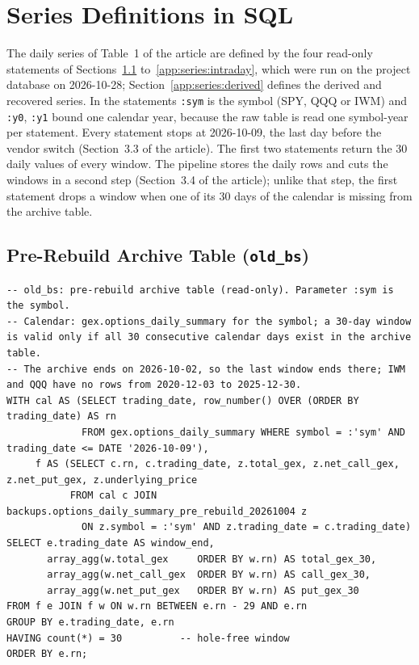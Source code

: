 \section{Series Definitions in SQL}
\label{sup:series}

The daily series of Table~1 of the article are defined by the four read-only statements of Sections~\ref{app:series:old} to~\ref{app:series:intraday}, which were run on the project database on 2026-10-28; Section~\ref{app:series:derived} defines the derived and recovered series. In the statements \texttt{:sym} is the symbol (SPY, QQQ or IWM) and \texttt{:y0}, \texttt{:y1} bound one calendar year, because the raw table is read one symbol-year per statement. Every statement stops at 2026-10-09, the last day before the vendor switch (Section~3.3 of the article). The first two statements return the 30 daily values of every window. The pipeline stores the daily rows and cuts the windows in a second step (Section~3.4 of the article); unlike that step, the first statement drops a window when one of its 30 days of the  calendar is missing from the archive table.

\subsection{Pre-Rebuild Archive Table (\texttt{old\_bs})}
\label{app:series:old}

\begin{lstlisting}[style=appcode]
-- old_bs: pre-rebuild archive table (read-only). Parameter :sym is the symbol.
-- Calendar: gex.options_daily_summary for the symbol; a 30-day window is valid only if all 30 consecutive calendar days exist in the archive table.
-- The archive ends on 2026-10-02, so the last window ends there; IWM and QQQ have no rows from 2020-12-03 to 2025-12-30.
WITH cal AS (SELECT trading_date, row_number() OVER (ORDER BY trading_date) AS rn
             FROM gex.options_daily_summary WHERE symbol = :'sym' AND trading_date <= DATE '2026-10-09'),
     f AS (SELECT c.rn, c.trading_date, z.total_gex, z.net_call_gex, z.net_put_gex, z.underlying_price
           FROM cal c JOIN backups.options_daily_summary_pre_rebuild_20261004 z
             ON z.symbol = :'sym' AND z.trading_date = c.trading_date)
SELECT e.trading_date AS window_end,
       array_agg(w.total_gex     ORDER BY w.rn) AS total_gex_30,
       array_agg(w.net_call_gex  ORDER BY w.rn) AS call_gex_30,
       array_agg(w.net_put_gex   ORDER BY w.rn) AS put_gex_30
FROM f e JOIN f w ON w.rn BETWEEN e.rn - 29 AND e.rn
GROUP BY e.trading_date, e.rn
HAVING count(*) = 30          -- hole-free window
ORDER BY e.rn;
\end{lstlisting}

